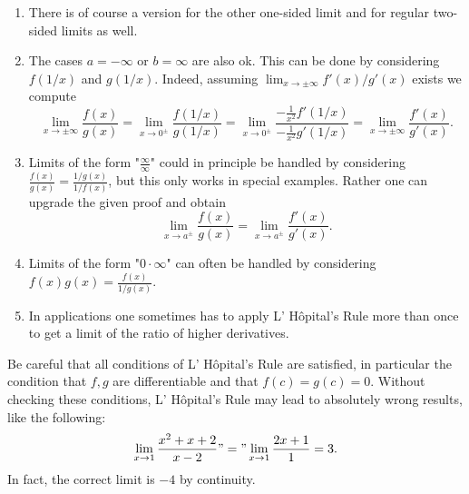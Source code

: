 \documentclass[10pt, a4paper]{article}
\begin{document}
\begin{remark}
    \begin{enumerate}[label = (\roman*)]
        \item There is of course a version for the other one-sided limit and for regular two-sided limits as well.
        \item The cases $a = -\infty$ or $b = \infty$ are also ok.
        This can be done by considering $f(1 / x)$ and $g(1 / x)$.
        Indeed,
        assuming $\lim_{x \rightarrow \pm\infty}f'(x) / g'(x)$ exists we compute
        \[
        \lim_{x \rightarrow \pm\infty}\frac{f(x)}{g(x)} = \lim_{x \rightarrow 0 ^ {\pm}}\frac{f(1 / x)}{g(1 / x)} = \lim_{x \rightarrow 0 ^ {\pm}}\frac{-\frac{1}{x ^ 2}f'(1 / x)}{-\frac{1}{x ^ 2}g'(1 / x)} = \lim_{x \rightarrow \pm\infty}\frac{f'(x)}{g'(x)}.
        \]
        \item Limits of the form "$\frac{\infty}{\infty}$" could in principle be handled by considering $\frac{f(x)}{g(x)} = \frac{1 / g(x)}{1 / f(x)}$,
        but this only works in special examples.
        Rather one can upgrade the given proof and obtain
        \[
        \lim_{x \rightarrow a ^ {\pm}}\frac{f(x)}{g(x)} = \lim_{x \rightarrow a ^ {\pm}}\frac{f'(x)}{g'(x)}.
        \]
        \item Limits of the form "$0 \cdot \infty$" can often be handled by considering $f(x)g(x) = \frac{f(x)}{1 / g(x)}$.
        \item In applications one sometimes has to apply L' H\^opital's Rule more than once to get a limit of the ratio of higher derivatives.
    \end{enumerate}
\end{remark}
Be careful that all conditions of L' H\^opital's Rule are satisfied,
in particular the condition that $f, g$ are differentiable and that $f(c) = g(c) = 0$.
Without checking these conditions,
L' H\^opital's Rule may lead to absolutely wrong results,
like the following:
\[
\lim_{x \rightarrow 1}\frac{x ^ 2 + x + 2}{x - 2} "=" \lim_{x \rightarrow 1}\frac{2x + 1}{1} = 3.
\]
In fact,
the correct limit is $-4$ by continuity.
\end{document}

